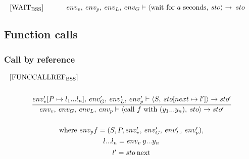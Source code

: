 \begin{equation}
\begin{minipage}{.2\linewidth}
$[\text{WAIT}_\text{BSS}]$
\end{minipage}
\begin{minipage}{.8\linewidth}
\centering
$env_v, \: env_p, \: env_L, \: env_G \vdash \langle \text{wait for } a \text{ seconds}, \: sto \rangle \xrightarrow{} \: sto$
\end{minipage}
\end{equation}



\subsection{Function calls}
\subsubsection*{Call by reference}
\begin{equation} \label{EQ:FORMELFUNCCALLREF}
\begin{split}
\begin{minipage}{\linewidth}
$[\text{FUNCCALLREF}_\text{BSS}]$
\end{minipage}
\\\\
\begin{minipage}{\linewidth}
\centering
$\cfrac{env'_v[P \mapsto l_1 ... l_n], \: env'_G, \: env'_L, \: env'_p \vdash \langle S, \: sto[next \mapsto l'] \rangle \xrightarrow{} sto'}{env_v, \: env_G, \: env_L, \: env_p \vdash \langle \text{call } f \text{ with } (y_1...y_n), \: sto \rangle \xrightarrow{} sto'}$
\end{minipage}
\\\\
\begin{minipage}{\linewidth}
\centering
where $env_p f = (S, P, env'_v, \: env_G', \: env'_L, \: env'_p),$
\end{minipage}
\\
\begin{minipage}{\linewidth}
\centering
$l... l_n = env_v \: y ... y_n$
\end{minipage}
\\
\begin{minipage}{\linewidth}
\centering
$l' = sto \: \text{next}$
\end{minipage}
\end{split}
\end{equation}
